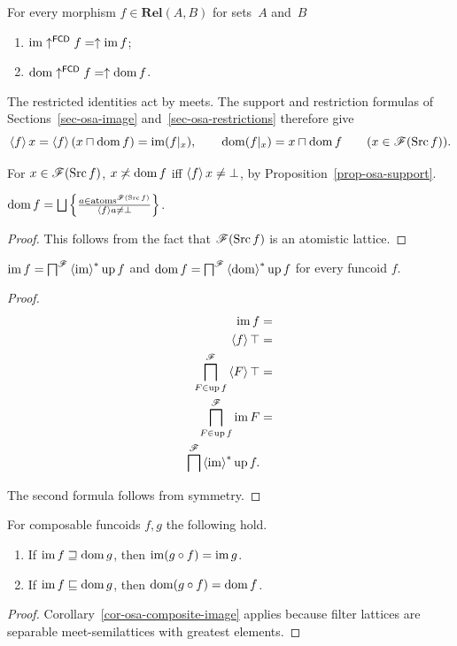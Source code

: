 \begin{obvious}
For every morphism $f\in\mathbf{Rel}(A,B)$ for sets~$A$ and~$B$
\begin{enumerate}
\item $\operatorname{im}\uparrow^{\mathsf{FCD}}f=\uparrow\operatorname{im} f$;
\item $\operatorname{dom}\uparrow^{\mathsf{FCD}}f=\uparrow\operatorname{dom} f$.
\end{enumerate}
\end{obvious}
The restricted identities act by meets. The support and restriction
formulas of Sections~\ref{sec-osa-image} and~\ref{sec-osa-restrictions}
therefore give
\[
 \left\langle f\right\rangle x=\left\langle f\right\rangle(x\sqcap\operatorname{dom} f)=\operatorname{im}(f|_x),\qquad
 \operatorname{dom}(f|_x)=x\sqcap\operatorname{dom} f
 \qquad(x\in\mathscr F(\operatorname{Src} f)).
\]
\begin{prop}\label{x-dom-fcd}
For $x\in\mathscr F(\operatorname{Src} f)$, $x\not\asymp\operatorname{dom} f$ iff
$\left\langle f\right\rangle x\ne\bot$, by Proposition~\ref{prop-osa-support}.
\end{prop}
\begin{cor}\label{dom-fcd-at}
$\dom f=\bigsqcup\setcond{a\in\atoms^{\mathscr{F}(\Src f)}}{\supfun
fa\ne\bot}$.\end{cor}
\begin{proof}
This follows from the fact that $\mathscr{F}(\operatorname{Src} f)$ is an atomistic
lattice.\end{proof}
\begin{thm}
$\operatorname{im} f=\bigsqcap^{\mathscr{F}}\left\langle \operatorname{im}\right\rangle ^{\ast}\operatorname{up} f$ and $\operatorname{dom}
f=\bigsqcap^{\mathscr{F}}\left\langle \operatorname{dom}\right\rangle ^{\ast}\operatorname{up} f$
for every funcoid $f$.\end{thm}
\begin{proof}
~
\begin{align*}
\operatorname{im} f & =\\
\left\langle f\right\rangle\top & =\\
\bigsqcap_{F\in\operatorname{up} f}^{\mathscr{F}}\left\langle F\right\rangle\top & =\\
\bigsqcap_{F\in\operatorname{up} f}^{\mathscr{F}}\operatorname{im} F & =\\
\bigsqcap^{\mathscr{F}}\left\langle \operatorname{im}\right\rangle ^{\ast}\operatorname{up} f.
\end{align*}


The second formula follows from symmetry.\end{proof}
\begin{prop}
For composable funcoids $f,g$ the following hold.
\begin{enumerate}
\item\label{im-gf} If $\operatorname{im} f\sqsupseteq\operatorname{dom} g$, then $\operatorname{im}(g\circ f)=\operatorname{im} g$.
\item\label{dom-gf} If $\operatorname{im} f\sqsubseteq\operatorname{dom} g$, then $\operatorname{dom}(g\circ f)=\operatorname{dom} f$.
\end{enumerate}
\end{prop}
\begin{proof}
Corollary~\ref{cor-osa-composite-image} applies because filter lattices
are separable meet-semilattices with greatest elements.
\end{proof}

